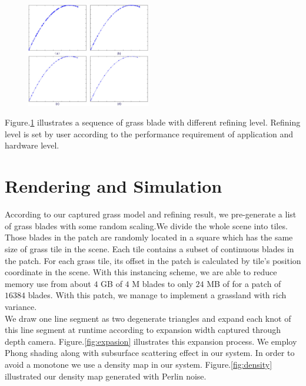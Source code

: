 \documentclass[10pt,journal,compsoc]{IEEEtran}
\begin{document}
\begin{figure}
    \centering
    \includegraphics[width=0.48\textwidth]{figs/lod.jpg}
    \label{fig:skeletonrefining}
\end{figure}

Figure.\ref{fig:skeletonrefining} illustrates a sequence of grass blade with different refining level. Refining level is set by user according to the performance requirement of application and hardware level.

\section{Rendering and Simulation}\label{sec:render}
According to our captured grass model and refining result, we pre-generate a list of grass blades with some random scaling.We divide the whole scene into tiles. Those blades in the patch are randomly located in a square which has the same size of grass tile in the scene. Each tile contains a subset of continuous blades in the patch. For each grass tile, its offset in the patch is calculated by tile's position coordinate in the scene. With this instancing scheme, we are able to reduce memory use from about $4$ GB of $4$ M blades to only $24$ MB of for a patch of $16384$ blades. With this patch, we manage to implement a grassland with rich variance.\\

We draw one line segment as two degenerate triangles and expand each knot of this line segment at runtime according to expansion width captured through depth camera. Figure.\ref{fig:expasion} illustrates this expansion process. We employ Phong shading along with subsurface scattering effect\cite{sousa2007vegetation} in our system. In order to avoid a monotone we use a density map in our system. Figure.\ref{fig:density} illustrated our density map generated with Perlin noise\cite{perlin1985image}. \\
\end{document}
